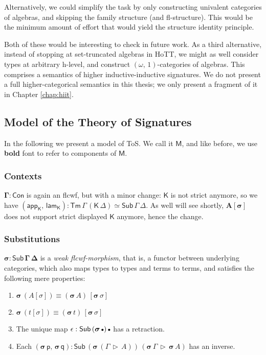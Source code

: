 \documentclass[12pt,a4paper,twoside,openany]{book}
\theoremstyle{remark}
\theoremstyle{definition}
\theoremstyle{theorem}
\newcommand{\bs}[1]{\boldsymbol{#1}}
\newcommand{\Con}{\mathsf{Con}}
\newcommand{\Sub}{\mathsf{Sub}}
\newcommand{\Tm}{\mathsf{Tm}}
\newcommand{\ext}{\triangleright}
\newcommand{\emptycon}{\scaleobj{.75}\bullet}
\newcommand{\lamK}{\mathsf{lam}_{\K}}
\newcommand{\appK}{\mathsf{app}_{\K}}
\newcommand{\p}{\mathsf{p}}
\newcommand{\q}{\mathsf{q}}
\newcommand{\K}{\mathsf{K}}
\newcommand{\bCon}{\bs{\Con}}
\newcommand{\bGamma}{\bs{\Gamma}}
\newcommand{\bsigma}{\bs{\sigma}}
\newcommand{\bM}{\bs{\mathsf{M}}}
\begin{document}
Alternatively, we could simplify the task by only constructing univalent
categories of algebras, and skipping the family structure (and
fl-structure). This would be the minimum amount of effort that would yield the
structure identity principle.

Both of these would be interesting to check in future work. As a third
alternative, instead of stopping at set-truncated algebras in HoTT, we might as
well consider types at arbitrary h-level, and construct
$(\omega,\,1)$-categories of algebras. This comprises a semantics of higher
inductive-inductive signatures. We do not present a full higher-categorical
semantics in this thesis; we only present a fragment of it in Chapter
\ref{chap:hiit}.


\subsection{Model of the Theory of Signatures}

In the following we present a model of ToS. We call it $\bM$, and like before,
we use \textbf{bold} font to refer to components of $\bM$.

\subsubsection{Contexts}

$\bGamma : \bCon$ is again an flcwf, but with a minor change: $\K$ is not strict
anymore, so we have $(\appK,\,\lamK) : \Tm\,\Gamma\,(\K\,\Delta) \simeq
\Sub\,\Gamma\,\Delta$. As well will see shortly, $\bs{A[\sigma]}$ does not
support strict displayed $\K$ anymore, hence the change.

\subsubsection{Substitutions}
\label{sec:iqiit-substitutions}

$\bs{\sigma : \Sub\,\Gamma\,\Delta}$ is a \emph{weak flcwf-morphism}, that is, a
functor between underlying categories, which also maps types to types and terms
to terms, and satisfies the following mere properties:
  \begin{enumerate}
    \item $\bsigma\,(A[\sigma]) \equiv (\bsigma\,A)\,[\bsigma\,\sigma]$
    \item $\bsigma\,(t[\sigma]) \equiv (\bsigma\,t)\,[\bsigma\,\sigma]$
    \item The unique map $\epsilon : \Sub\,(\bsigma\,\emptycon)\,\emptycon$ has a retraction.
    \item Each $(\bsigma\,\p,\,\bsigma\,\q) : \Sub\,(\bsigma\,(\Gamma\,\ext\,A))\,(\bsigma\,\Gamma\,\ext\,\bsigma\,A)$ has an inverse.
  \end{enumerate}
\end{document}
